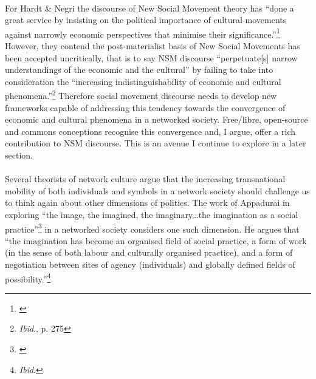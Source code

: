 \documentclass[11pt,titlepage]{book}
\begin{document}
\paragraph{}For Hardt \& Negri the discourse of New Social Movement theory has ``done a great service by insisting on the political importance of cultural movements against narrowly economic perspectives that minimise their significance.''\footnote{\cite[p. 275]{Hardt:2001jl}} However, they contend the post-materialist basis of New Social Movements has been accepted uncritically, that is to say NSM discourse ``perpetuate[s] narrow understandings of the economic and the cultural'' by failing to take into consideration the ``increasing indistinguishability of economic and cultural phenomena.''\footnote{\textit{Ibid}., p. 275} Therefore social movement discourse needs to develop new frameworks capable of addressing this tendency towards the convergence of economic and cultural phenomena in a networked society. Free/libre, open-source and commons conceptions recognise this convergence and, I argue, offer a rich  contribution to NSM discourse. This is an avenue I continue to explore in a later section.

\paragraph{}Several theorists of network culture argue that the increasing transnational mobility of both individuals and symbols in a network society should challenge us to think again about other dimensions of politics. The work of Appadurai in exploring ``the image, the imagined, the imaginary\ldots the imagination as a social practice''\footnote{\cite[p. 31, original emphasis removed]{Appadurai:1996lp}} in a networked society considers one such dimension. He argues that ``the imagination has become an organised field of social practice, a form of work (in the sense of both labour and culturally organised practice), and a form of negotiation between sites of agency (individuals) and globally defined fields of possibility.''\footnote{\textit{Ibid}.}
\end{document}
